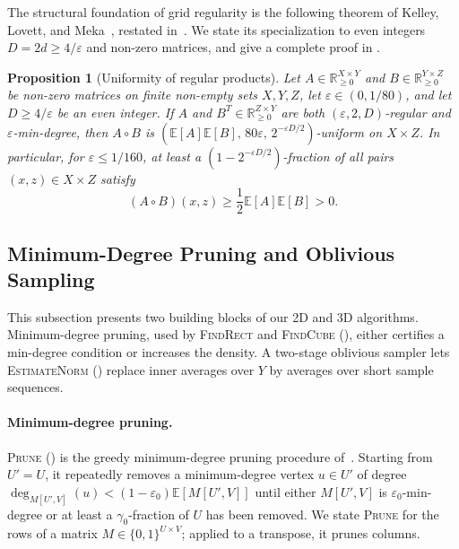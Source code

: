 \documentclass[11pt]{article}
\newtheorem{proposition}[theorem]{Proposition}
\theoremstyle{definition}
\renewcommand{\label}[1]{}%
\newcommand{\E}{\mathbb{E}}
\newcommand{\R}{\mathbb{R}}
\newcommand{\dens}[1]{\E[#1]}
\newcommand{\Prune}{\textnormal{\textsc{Prune}}}
\newcommand{\EstimateNorm}{\textnormal{\textsc{EstimateNorm}}}
\newcommand{\FindRect}{\textnormal{\textsc{FindRect}}}
\newcommand{\FindCube}{\textnormal{\textsc{FindCube}}}
\begin{document}
The structural foundation of grid regularity is the following theorem of Kelley, Lovett, and Meka~\cite[Lemma~4.8]{KelleyLM23}, restated in~\cite[Theorem~2.1]{AFKLM24}. We state its specialization to even integers $D = 2d \ge 4/\varepsilon$ and non-zero matrices, and give a complete proof in .

\begin{proposition}[Uniformity of regular products]
\label{prop:regular-product}
Let $A \in \R_{\ge 0}^{X \times Y}$ and $B \in \R_{\ge 0}^{Y \times Z}$ be non-zero matrices on finite non-empty sets $X, Y, Z$, let $\varepsilon \in (0, 1/80)$, and let $D \ge 4/\varepsilon$ be an even integer. If $A$ and $B^T \in \R_{\ge 0}^{Z \times Y}$ are both $(\varepsilon, 2, D)$-regular and $\varepsilon$-min-degree, then $A \circ B$ is $(\dens{A}\dens{B}, \, 80\varepsilon, \, 2^{-\varepsilon D / 2})$-uniform on $X \times Z$. In particular, for $\varepsilon \le 1/160$, at least a $(1 - 2^{-\varepsilon D / 2})$-fraction of all pairs $(x, z) \in X \times Z$ satisfy
\[
    (A \circ B)(x, z) \ge \frac{1}{2}\dens{A}\dens{B} > 0.
\]
\end{proposition}

\subsection{Minimum-Degree Pruning and Oblivious Sampling}
\label{sec:prelim-tools}

This subsection presents two building blocks of our 2D and 3D algorithms. Minimum-degree pruning, used by \FindRect{} and \FindCube{} (), either certifies a min-degree condition or increases the density. A two-stage oblivious sampler lets \EstimateNorm{} () replace inner averages over $Y$ by averages over short sample sequences.

\paragraph{Minimum-degree pruning.}
\Prune{} () is the greedy minimum-degree pruning procedure of~\cite[Algorithm~5.1 \& Lemma~5.1]{AFKLM24}. Starting from $U' = U$, it repeatedly removes a minimum-degree vertex $u \in U'$ of degree $\deg_{M[U', V]}(u) < (1 - \varepsilon_0)\dens{M[U', V]}$ until either $M[U', V]$ is $\varepsilon_0$-min-degree or at least a $\gamma_0$-fraction of $U$ has been removed. We state \Prune{} for the rows of a matrix $M \in \{0, 1\}^{U \times V}$; applied to a transpose, it prunes columns.
\end{document}
